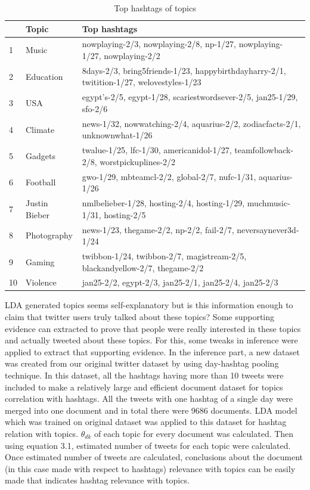 \documentclass[a4paper]{report}
\begin{document}
\begin{table}[!ht]
\begin{tabular}{|p{0.5cm}|p{2.5cm}|p{10.5cm}|}
\hline  & \bf Topic & \bf Top hashtags \\ \hline
1 & Music & nowplaying-2/3, nowplaying-2/8, np-1/27, nowplaying-1/27, nowplaying-2/2   \\ \hline
2 & Education & 8days-2/3, bring5friends-1/23, happybirthdayharry-2/1, twitition-1/27, welovestyles-1/23 \\ \hline
3 & USA & egypt's-2/5, egypt-1/28, scariestwordsever-2/5, jan25-1/29, sfo-2/6 \\ \hline
4 & Climate & news-1/32, nowwatching-2/4, aquarius-2/2, zodiacfacts-2/1, unknownwhat-1/26 \\ \hline
5 & Gadgets & twalue-1/25, lfc-1/30, americanidol-1/27, teamfollowback-2/8, worstpickuplines-2/2 \\ \hline
6 & Football & gwo-1/29, mbteamcl-2/2, global-2/7, nufc-1/31, aquarius-1/26 \\ \hline
7 & Justin Bieber & nmlbelieber-1/28, hosting-2/4, hosting-1/29, muchmusic-1/31, hosting-2/5 \\ \hline
8 & Photography & news-1/23, thegame-2/2, np-2/2, fail-2/7, neversaynever3d-1/24\\ \hline
9 & Gaming & twibbon-1/24, twibbon-2/7, magistream-2/5, blackandyellow-2/7, thegame-2/2 \\ \hline
10 & Violence & jan25-2/2, egypt-2/3, jan25-2/1, jan25-2/4, jan25-2/3 \\ \hline
\end{tabular}
\caption{Top hashtags of topics}
\label{table:topic-hashtags}
\end{table}

LDA generated topics seems self-explanatory but is this information enough to claim that twitter users truly talked about these topics? Some supporting evidence can extracted to prove that people were really interested in these topics and actually tweeted about these topics. For this, some tweaks in inference were applied to extract that supporting evidence. In the inference part, a new dataset was created from our original twitter dataset by using day-hashtag pooling technique. In this dataset, all the hashtags having more than 10 tweets were included to make a relatively large and efficient document dataset for topics correlation with hashtags. All the tweets with one hashtag of a single day were merged into one document and in total there were 9686 documents. LDA model which was trained on original dataset was applied to this dataset for hashtag relation with topics. $\theta_{dk}$ of each topic for every document was calculated. Then using equation 3.1, estimated number of tweets for each topic were calculated. Once estimated number of tweets are calculated, conclusions about the document (in this case made with respect to hashtags) relevance with topics can be easily made that indicates hashtag relevance with topics.
\end{document}
